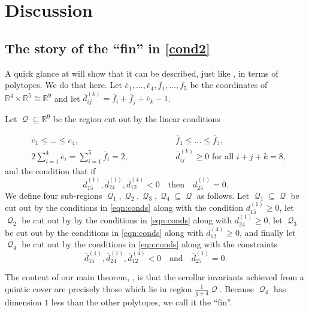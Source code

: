 \documentclass[11pt]{amsart}
\numberwithin{theorem}{section}
\numberwithin{equation}{section}
\theoremstyle{definition}\newtheorem{defn}[theorem]{Definition}
\theoremstyle{definition}\newtheorem{remark}[theorem]{Remark}
\theoremstyle{definition}\newtheorem{question}[theorem]{Question}
\theoremstyle{definition}\newtheorem{problem}[theorem]{Problem}
\newcommand{\RR}{\mathbb{R}}
\newcommand{\ove}{\overline{e}}
\newcommand{\ovf}{\overline{f}}
\newcommand{\ovd}{\overline{d}}
\DeclareMathOperator{\qpolytope}{\mathcal{Q}}
\renewcommand{\subset}{\subseteq}
\begin{document}
\section{Discussion}
\label{sec:discussion}
\subsection{The story of the ``fin'' in \texorpdfstring{\ref{cond2}}{Theorem 1.5(ii)}} 
A quick glance at  will show that it can be described, just like , in terms of polytopes. We do that here. Let $\ove_1,\dots,\ove_4,\ovf_1,\dots,\ovf_5$ be the coordinates of $\RR^4 \times \RR^5 \cong \RR^9$ and let $\ovd_{ij}^{(k)} = \ovf_i + \ovf_j + \ove_k - 1$.

Let $\qpolytope \subset \RR^9$ be the region cut out by the linear conditions

\begin{equation}
  \label{eqn:conds}
  \begin{aligned}
    &\ove_1 \leq \dots \leq \ove_4, \qquad\qquad && \ovf_1 \leq \dots \leq \ovf_5, \\
    &2\sum_{i=1}^4 \ove_i = \sum_{i=1}^5 \ovf_i = 2, \qquad\qquad && \ovd_{ij}^{(k)} \geq 0 \text{  for all  }i + j + k = 8, 
  \end{aligned}
\end{equation}
and the condition that if
\begin{equation}
  \label{eqns:conds2}
  \ovd_{15}^{(1)}, \ovd_{24}^{(1)}, \ovd_{12}^{(4)} < 0 \quad \text{then} \quad \ovd_{25}^{(1)} = 0.
\end{equation}
We define four sub-regions $\qpolytope_1, \qpolytope_2, \qpolytope_3, \qpolytope_4 \subset \qpolytope$ as follows. Let $\qpolytope_1 \subset \qpolytope$ be cut out by the conditions in \eqref{eqn:conds} along with the condition $d_{15}^{(1)} \geq 0$, let $\qpolytope_2$ be cut out by by the conditions in \eqref{eqn:conds} along with $d_{24}^{(1)} \geq 0$, let $\qpolytope_3$ be cut out by the conditions in \eqref{eqn:conds} along with $d_{12}^{(4)} \geq 0$, and finally let $\qpolytope_4$ be cut out by the conditions in \eqref{eqn:conds} along with the constraints
\[
\ovd_{15}^{(1)}, \ovd_{24}^{(1)}, \ovd_{12}^{(4)} < 0 \quad \text{and} \quad \ovd_{25}^{(1)} = 0.
\]

The content of our main theorem, , is that the scrollar invariants achieved from a quintic cover are precisely those which lie in region $\tfrac{1}{g+4} \qpolytope$. Because $\qpolytope_4$ has dimension $1$ less than the other polytopes, we call it the ``fin''. 
\end{document}

